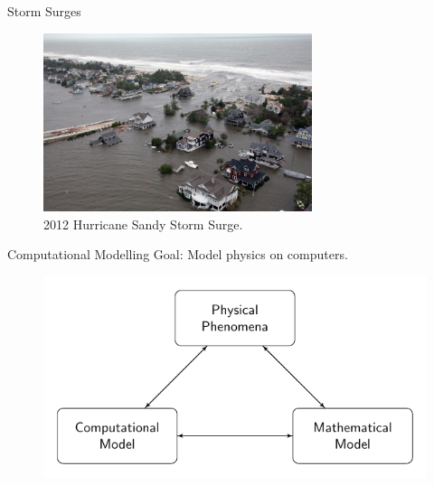 \documentclass[]{beamer}
\begin{document}
\begin{frame}{Storm Surges}
		\begin{figure}
			\includegraphics[width=0.7\textwidth]{./Pics/Examples/Sandy-storm-surge.jpg}
			\caption{2012 Hurricane Sandy Storm Surge.}
		\end{figure}
\end{frame}



\begin{frame}{Computational Modelling}
	Goal: Model physics on computers. \pause
	\begin{figure}
		\includegraphics[width=\textwidth]{./Pics/ModelDiagrams/FlowChart.pdf}
	\end{figure}
\end{frame}
\end{document}

